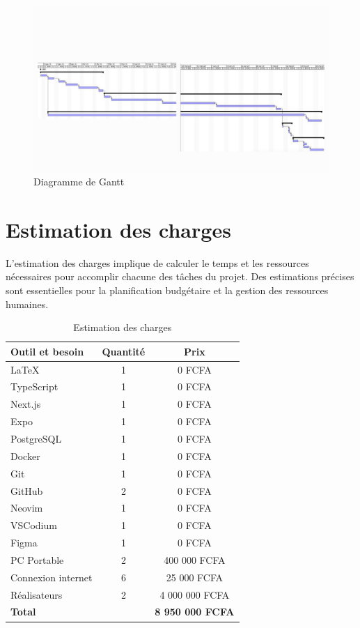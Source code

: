 \begin{figure}[H]
  \centering
  \includegraphics[width=1\textwidth]{capture/gantt.png}
  \caption{Diagramme de Gantt}
\end{figure}



\section{Estimation des charges}
L’estimation des charges implique de calculer le temps et les ressources
nécessaires pour accomplir chacune des tâches du projet.
Des estimations précises sont essentielles pour la planification budgétaire et
la gestion des ressources humaines.


\begin{table}[htbp]
  \centering
  \begin{tabular}{|l|c|c|}
    \hline
    \textbf{Outil et besoin} & \textbf{Quantité} & \textbf{Prix} \\ \hline
    \LaTeX & 1 & 0 FCFA  \\ \hline
    TypeScript & 1 & 0 FCFA  \\ \hline
    Next.js & 1 & 0 FCFA  \\ \hline
    Expo & 1 & 0 FCFA  \\ \hline
    PostgreSQL & 1 & 0 FCFA  \\ \hline
    Docker & 1 & 0 FCFA  \\ \hline
    Git & 1 & 0 FCFA  \\ \hline
    GitHub & 2 & 0 FCFA  \\ \hline
    Neovim & 1 & 0 FCFA  \\ \hline
    VSCodium & 1 & 0 FCFA  \\ \hline
    Figma & 1 & 0 FCFA  \\ \hline
    PC Portable & 2 & 400 000 FCFA  \\ \hline
    Connexion internet & 6 & 25 000 FCFA \\ \hline
    Réalisateurs & 2 & 4 000 000 FCFA \\ \hline
    \multicolumn{2}{|l|}{\textbf{Total}} & \textbf{8 950 000 FCFA} \\ \hline
  \end{tabular}
  \caption{Estimation des charges}
\end{table}

